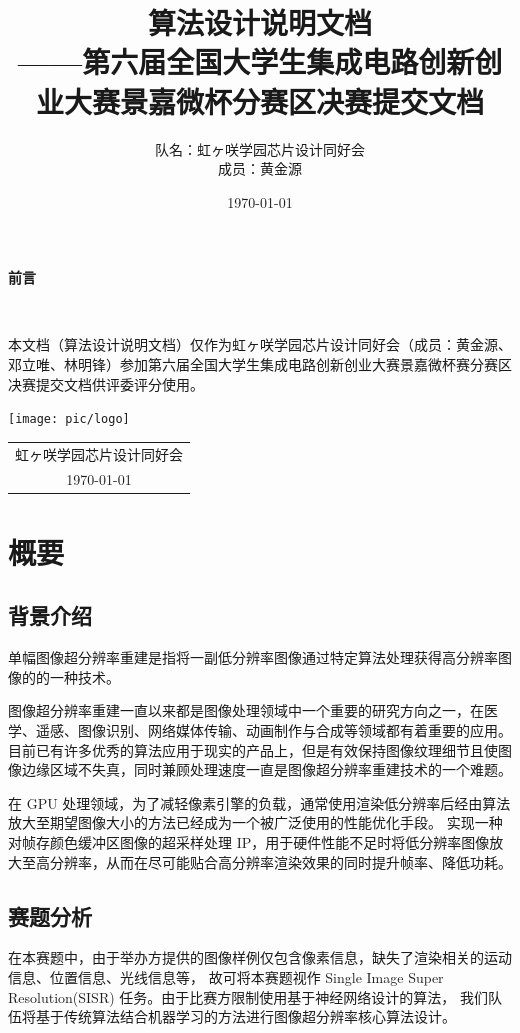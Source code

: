 \documentclass[12pt, a4paper, oneside]{ctexbook}
\title{{\Huge{\textbf{算法设计说明文档}}}\normalsize{\\——第六届全国大学生集成电路创新创业大赛景嘉微杯分赛区决赛提交文档}}
\author{队名：虹ヶ咲学园芯片设计同好会\\ 成员：黄金源\space邓立唯\space林明锋}
\date{\today}
\begin{document}
	
	
	
	\maketitle	
	\setcounter{page}{1}
	\begin{center}
		\Huge\textbf{前言}
	\end{center}~\
	
	本文档（算法设计说明文档）仅作为虹ヶ咲学园芯片设计同好会（成员：黄金源、邓立唯、林明锋）参加第六届全国大学生集成电路创新创业大赛景嘉微杯赛分赛区决赛提交文档供评委评分使用。
	~\\
	\begin{flushright}
		\texttt{[image: pic/logo]}\\
		\begin{tabular}{c}
			虹ヶ咲学园芯片设计同好会\\
			\today
		\end{tabular}
	\end{flushright}
	\newpage
	\setcounter{page}{1}
	\tableofcontents
	\newpage
	\setcounter{page}{1}
	
	\chapter{概要}
	\section{背景介绍}
	单幅图像超分辨率重建是指将一副低分辨率图像通过特定算法处理获得高分辨率图像的的一种技术。
	
	图像超分辨率重建一直以来都是图像处理领域中一个重要的研究方向之一，在医学、遥感、图像识别、网络媒体传输、动画制作与合成等领域都有着重要的应用。
	目前已有许多优秀的算法应用于现实的产品上，但是有效保持图像纹理细节且使图像边缘区域不失真，同时兼顾处理速度一直是图像超分辨率重建技术的一个难题。
	\par 在 GPU 处理领域，为了减轻像素引擎的负载，通常使用渲染低分辨率后经由算法放大至期望图像大小的方法已经成为一个被广泛使用的性能优化手段。
	实现一种对帧存颜色缓冲区图像的超采样处理 IP，用于硬件性能不足时将低分辨率图像放大至高分辨率，从而在尽可能贴合高分辨率渲染效果的同时提升帧率、降低功耗。
	\section{赛题分析}
	在本赛题中，由于举办方提供的图像样例仅包含像素信息，缺失了渲染相关的运动信息、位置信息、光线信息等，
	故可将本赛题视作 Single Image Super Resolution(SISR) 任务。由于比赛方限制使用基于神经网络设计的算法，
	我们队伍将基于传统算法结合机器学习的方法进行图像超分辨率核心算法设计。
	
\end{document}
